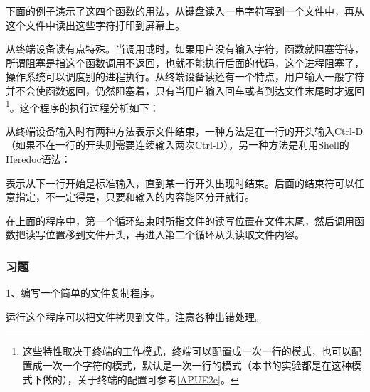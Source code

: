 下面的例子演示了这四个函数的用法，从键盘读入一串字符写到一个文件中，再从这个文件中读出这些字符打印到屏幕上。





从终端设备读有点特殊。当调用或时，如果用户没有输入字符，函数就阻塞等待，所谓阻塞是指这个函数调用不返回，也就不能执行后面的代码，这个进程阻塞了，操作系统可以调度别的进程执行。从终端设备读还有一个特点，用户输入一般字符并不会使函数返回，仍然阻塞着，只有当用户输入回车或者到达文件末尾时才返回\footnote[34]{这些特性取决于终端的工作模式，终端可以配置成一次一行的模式，也可以配置成一次一个字符的模式，默认是一次一行的模式（本书的实验都是在这种模式下做的），关于终端的配置可参考\hyperlink{db.bi01.bibli.apue}{[APUE2e]}。}。这个程序的执行过程分析如下：




从终端设备输入时有两种方法表示文件结束，一种方法是在一行的开头输入Ctrl-D（如果不在一行的开头则需要连续输入两次Ctrl-D），另一种方法是利用Shell的Heredoc语法：




表示从下一行开始是标准输入，直到某一行开头出现时结束。\BookCode{\textless{}\textless{}}后面的结束符可以任意指定，不一定得是，只要和输入的内容能区分开就行。



在上面的程序中，第一个循环结束时所指文件的读写位置在文件末尾，然后调用函数把读写位置移到文件开头，再进入第二个循环从头读取文件内容。


\subsubsection*{习题}
%


1、编写一个简单的文件复制程序。




运行这个程序可以把文件拷贝到文件。注意各种出错处理。



